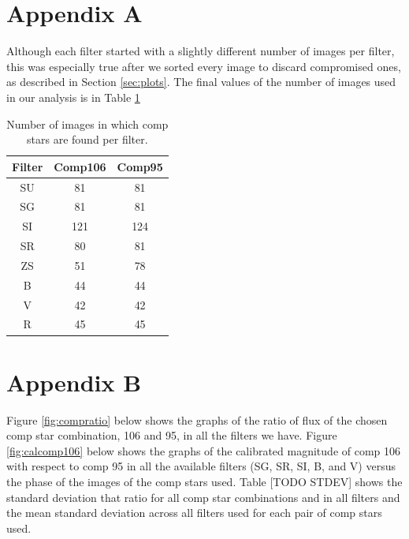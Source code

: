 \documentclass[linenumbers]{aastex631}
\begin{document}

%


%

\appendix

\section{Appendix A} \label{appa}
Although each filter started with a slightly different number of images per filter, this was especially true after we sorted every image to discard compromised ones, as described in Section \ref{sec:plots}. The final values of the number of images used in our analysis is in Table \ref{tab:numimg}

\begin{table}[H]
    \centering
    \begin{tabular}{ | c | c | c | }
    \hline
        Filter & Comp106 & Comp95 \\ \hline \hline
        SU & 81 & 81 \\ \hline
        SG & 81 & 81 \\ \hline
        SI & 121 & 124 \\ \hline
        SR & 80 & 81 \\ \hline
        ZS & 51 & 78 \\ \hline
        B & 44 & 44 \\ \hline
        V & 42 & 42 \\ \hline
        R & 45 & 45 \\ \hline
    \end{tabular}
    \caption{Number of images in which comp stars are found per filter.}
    \label{tab:numimg}
\end{table}

\section{Appendix B} \label{appb}
Figure \ref{fig:compratio} below shows the graphs of the ratio of flux of the chosen comp star combination, 106 and 95, in all the filters we have. Figure \ref{fig:calcomp106} below shows the graphs of the calibrated magnitude of comp 106 with respect to comp 95 in all the available filters (SG, SR, SI, B, and V) versus the phase of the images of the comp stars used. Table [TODO STDEV] shows the standard deviation that ratio for all comp star combinations and in all filters and the mean standard deviation across all filters used for each pair of comp stars used.
\end{document}
